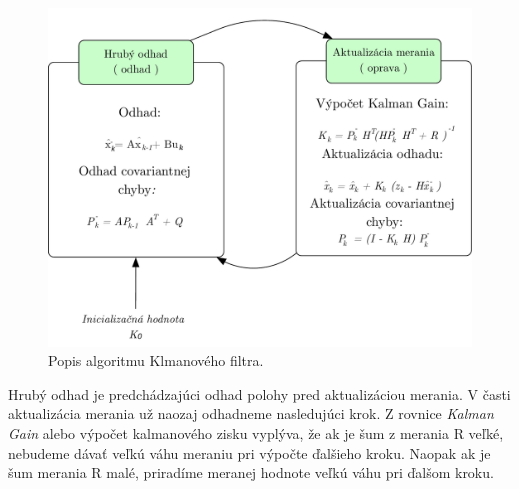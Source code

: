 \begin{figure}[H]
\begin{center}
	\includegraphics[scale=0.55]{images/kalman}
	\caption{Popis algoritmu Klmanového filtra. \cite{kalman_dummies}}
	\end{center}
\end{figure}

Hrubý odhad je predchádzajúci odhad polohy pred aktualizáciou merania. V časti aktualizácia merania už naozaj odhadneme nasledujúci krok. Z rovnice \textit{Kalman Gain} alebo výpočet kalmanového zisku vyplýva, že ak je šum z merania R veľké, nebudeme dávať veľkú váhu meraniu pri výpočte ďalšieho kroku. Naopak ak je šum merania R malé, priradíme meranej hodnote veľkú váhu pri ďalšom kroku. \cite{Kalman_web}